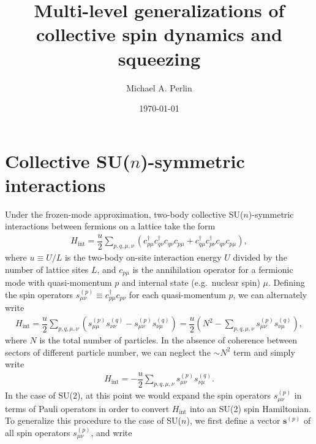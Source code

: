 \documentclass[nofootinbib,notitlepage,11pt]{revtex4-2}
\renewcommand{\t}{\text} %
\newcommand{\f}[2]{\dfrac{#1}{#2}} %
\newcommand{\p}[1]{\left(#1\right)} %
\renewcommand{\v}{\bm} %
\newcommand{\1}{\mathds{1}}
\begin{document}
\thispagestyle{fancy}

\title{Multi-level generalizations of collective spin dynamics and
  squeezing}%
\author{Michael A. Perlin}%
\date{\today}

\maketitle

\tableofcontents

\section{Collective SU($n$)-symmetric interactions}

Under the frozen-mode approximation, two-body collective
SU($n$)-symmetric interactions between fermions on a lattice take the
form\cite{perlin2019effective}
\begin{align}
  H_{\t{int}} = \f{u}{2} \sum_{p,q,\mu,\nu}
  \p{c_{p\mu}^\dag c_{q\nu}^\dag c_{q\nu} c_{p\mu}
    + c_{q\mu}^\dag c_{p\nu}^\dag c_{q\nu} c_{p\mu}},
\end{align}
where $u\equiv U/L$ is the two-body on-site interaction energy $U$
divided by the number of lattice sites $L$, and $c_{p\mu}$ is the
annihilation operator for a fermionic mode with quasi-momentum $p$ and
internal state (e.g.~nuclear spin) $\mu$.  Defining the spin operators
$s_{\mu\nu}^{(p)}\equiv c_{p\mu}^\dag c_{p\nu}$ for each
quasi-momentum $p$, we can alternately write
\begin{align}
  H_{\t{int}} = \f{u}{2} \sum_{p,q,\mu,\nu}
  \p{s_{\mu\mu}^{(p)} s_{\nu\nu}^{(q)} - s_{\mu\nu}^{(p)} s_{\nu\mu}^{(q)}}
  = \f{u}{2}\p{N^2 - \sum_{p,q,\mu,\nu} s_{\mu\nu}^{(p)} s_{\nu\mu}^{(q)}},
\end{align}
where $N$ is the total number of particles.  In the absence of
coherence between sectors of different particle number, we can neglect
the $\sim N^2$ term and simply write
\begin{align}
  H_{\t{int}}
  = - \f{u}{2} \sum_{p,q,\mu,\nu} s_{\mu\nu}^{(p)} s_{\nu\mu}^{(q)}.
\end{align}
In the case of SU(2), at this point we would expand the spin operators
$s_{\mu\nu}^{(p)}$ in terms of Pauli operators in order to convert
$H_{\t{int}}$ into an SU(2) spin Hamiltonian.  To generalize this
procedure to the case of SU($n$), we first define a vector
$\v s^{(p)}$ of all spin operators $s_{\mu\nu}^{(p)}$, and write
\end{document}
